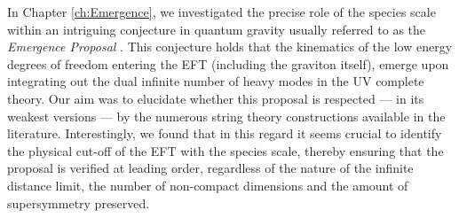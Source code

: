 
In Chapter \ref{ch:Emergence}, we investigated the precise role of the species scale within an intriguing conjecture in quantum gravity usually referred to as the \emph{Emergence Proposal} \cite{Harlow:2015lma, Grimm:2018ohb, Heidenreich:2018kpg, Palti:2019pca}. This conjecture holds that the kinematics of the low energy degrees of freedom entering the EFT (including the graviton itself), emerge upon integrating out the dual infinite number of heavy modes in the UV complete theory. Our aim was to elucidate whether this proposal is respected — in its weakest versions — by the numerous string theory constructions available in the literature. Interestingly, we found that in this regard it seems crucial to identify the physical cut-off of the EFT with the species scale, thereby ensuring that the proposal is verified at leading order, regardless of the nature of the infinite distance limit, the number of non-compact dimensions and the amount of supersymmetry preserved. 

